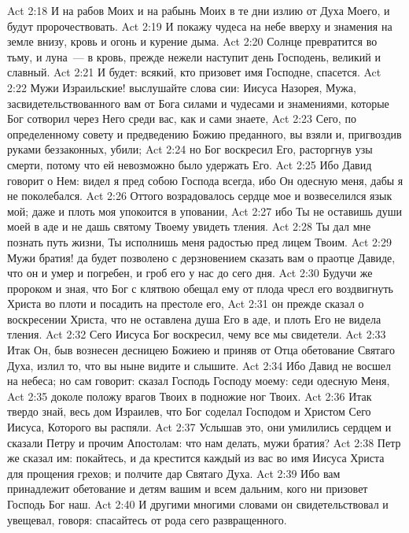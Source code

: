 \vs Act 2:18 И на рабов Моих и на рабынь Моих в те дни излию от Духа Моего, и будут пророчествовать.
\vs Act 2:19 И покажу чудеса на небе вверху и знамения на земле внизу, кровь и огонь и курение дыма.
\vs Act 2:20 Солнце превратится во тьму, и луна~--- в кровь, прежде нежели наступит день Господень, великий и славный.
\vs Act 2:21 И будет: всякий, кто призовет имя Господне, спасется.
\vs Act 2:22 Мужи Израильские! выслушайте слова сии: Иисуса Назорея, Мужа, засвидетельствованного вам от Бога силами и чудесами и знамениями, которые Бог сотворил через Него среди вас, как и сами знаете,
\vs Act 2:23 Сего, по определенному совету и предведению Божию преданного, вы взяли и, пригвоздив руками беззаконных, убили;
\vs Act 2:24 но Бог воскресил Его, расторгнув узы смерти, потому что ей невозможно было удержать Его.
\vs Act 2:25 Ибо Давид говорит о Нем: видел я пред собою Господа всегда, ибо Он одесную меня, дабы я не поколебался.
\vs Act 2:26 Оттого возрадовалось сердце мое и возвеселился язык мой; даже и плоть моя упокоится в уповании,
\vs Act 2:27 ибо Ты не оставишь души моей в аде и не дашь святому Твоему увидеть тления.
\vs Act 2:28 Ты дал мне познать путь жизни, Ты исполнишь меня радостью пред лицем Твоим.
\vs Act 2:29 Мужи братия! да будет позволено с дерзновением сказать вам о праотце Давиде, что он и умер и погребен, и гроб его у нас до сего дня.
\vs Act 2:30 Будучи же пророком и зная, что Бог с клятвою обещал ему от плода чресл его воздвигнуть Христа во плоти и посадить на престоле его,
\vs Act 2:31 он прежде сказал о воскресении Христа, что не оставлена душа Его в аде, и плоть Его не видела тления.
\vs Act 2:32 Сего Иисуса Бог воскресил, чему все мы свидетели.
\vs Act 2:33 Итак Он, быв вознесен десницею Божиею и приняв от Отца обетование Святаго Духа, излил то, что вы ныне видите и слышите.
\vs Act 2:34 Ибо Давид не восшел на небеса; но сам говорит: сказал Господь Господу моему: седи одесную Меня,
\vs Act 2:35 доколе положу врагов Твоих в подножие ног Твоих.
\vs Act 2:36 Итак твердо знай, весь дом Израилев, что Бог соделал Господом и Христом Сего Иисуса, Которого вы распяли.
\rsbpar\vs Act 2:37 Услышав это, они умилились сердцем и сказали Петру и прочим Апостолам: что нам делать, мужи братия?
\vs Act 2:38 Петр же сказал им: покайтесь, и да крестится каждый из вас во имя Иисуса Христа для прощения грехов; и полчите дар Святаго Духа.
\vs Act 2:39 Ибо вам принадлежит обетование и детям вашим и всем дальним, кого ни призовет Господь Бог наш.
\vs Act 2:40 И другими многими словами он свидетельствовал и увещевал, говоря: спасайтесь от рода сего развращенного.
